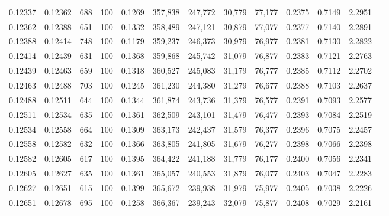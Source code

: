 \begin{tabular}{rrrrrrrrrrrrr}
0.12337 & 0.12362 &   688 & 100 &                                     0.1269 & 357,838 & 247,772 &  30,779 &  77,177 & 0.2375 & 0.7149 & 2.2951 \\
0.12362 & 0.12388 &   651 & 100 &                                     0.1332 & 358,489 & 247,121 &  30,879 &  77,077 & 0.2377 & 0.7140 & 2.2891 \\
0.12388 & 0.12414 &   748 & 100 &                                     0.1179 & 359,237 & 246,373 &  30,979 &  76,977 & 0.2381 & 0.7130 & 2.2822 \\
0.12414 & 0.12439 &   631 & 100 &                                     0.1368 & 359,868 & 245,742 &  31,079 &  76,877 & 0.2383 & 0.7121 & 2.2763 \\
0.12439 & 0.12463 &   659 & 100 &                                     0.1318 & 360,527 & 245,083 &  31,179 &  76,777 & 0.2385 & 0.7112 & 2.2702 \\
0.12463 & 0.12488 &   703 & 100 &                                     0.1245 & 361,230 & 244,380 &  31,279 &  76,677 & 0.2388 & 0.7103 & 2.2637 \\
0.12488 & 0.12511 &   644 & 100 &                                     0.1344 & 361,874 & 243,736 &  31,379 &  76,577 & 0.2391 & 0.7093 & 2.2577 \\
0.12511 & 0.12534 &   635 & 100 &                                     0.1361 & 362,509 & 243,101 &  31,479 &  76,477 & 0.2393 & 0.7084 & 2.2519 \\
0.12534 & 0.12558 &   664 & 100 &                                     0.1309 & 363,173 & 242,437 &  31,579 &  76,377 & 0.2396 & 0.7075 & 2.2457 \\
0.12558 & 0.12582 &   632 & 100 &                                     0.1366 & 363,805 & 241,805 &  31,679 &  76,277 & 0.2398 & 0.7066 & 2.2398 \\
0.12582 & 0.12605 &   617 & 100 &                                     0.1395 & 364,422 & 241,188 &  31,779 &  76,177 & 0.2400 & 0.7056 & 2.2341 \\
0.12605 & 0.12627 &   635 & 100 &                                     0.1361 & 365,057 & 240,553 &  31,879 &  76,077 & 0.2403 & 0.7047 & 2.2283 \\
0.12627 & 0.12651 &   615 & 100 &                                     0.1399 & 365,672 & 239,938 &  31,979 &  75,977 & 0.2405 & 0.7038 & 2.2226 \\
0.12651 & 0.12678 &   695 & 100 &                                     0.1258 & 366,367 & 239,243 &  32,079 &  75,877 & 0.2408 & 0.7029 & 2.2161 \\

\end{tabular}
